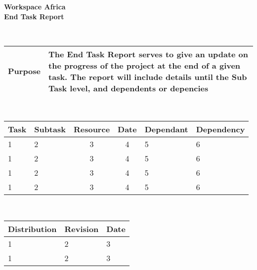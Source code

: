 \documentclass[a4paper,12pt]{article}
\date{07/09/2016}
\author{Preshane Pillay}
\begin{document}
   \centering
      \begin{Huge}
	{\bfseries Workspace Africa} \\
	{\bfseries End Task Report} \\ 
      \end{Huge}
  
  \\[4cm]
      
      \begin{tabular}{|p{3cm}|p{10cm}|}
	\hline
	{\bfseries Purpose} & {The End Task Report serves to give an update on the progress of the project at the end of a given task. The report will include details until the Sub Task level, and dependents or depencies}\\
	\hline
      \end{tabular}
      
  \\[4cm]
  
    \centering 
    \caption{End Task Report}
      \begin{small}
	\begin{tabular}{||l|l|c|c|l|l||}
	  \hline
	 {\bfseries Task} & {\bfseries Subtask} & {\bfseries Resource} & {\bfseries Date} & {\bfseries Dependant} & {\bfseries Dependency} \\
	  \hline
       
	      1 & 2 & 3 & 4 & 5 & 6 \\
	  \hline
	      1 & 2 & 3 & 4 & 5 & 6 \\
	  \hline
	      1 & 2 & 3 & 4 & 5 & 6 \\
	  \hline
	      1 & 2 & 3 & 4 & 5 & 6 \\
	   \hline
	\end{tabular}
      \end{small}
      
      \\[4cm]

      \begin{tabular}{|p{5cm}|p{5cm}|p{2cm}|}
	\hline
	{\bfseries Distribution} & {\bfseries Revision} & {\bfseries Date} \\
	\hline
 
	     1 & 2 & 3 \\
	\hline
	     1 & 2 & 3 \\
	\hline
      \end{tabular}
\end{document}
